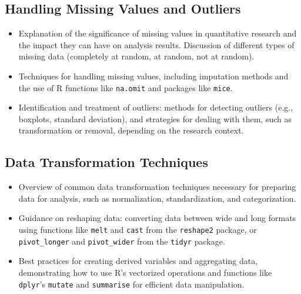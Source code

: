 \documentclass[
]{book}
\begin{document}
\hypertarget{handling-missing-values-and-outliers}{%
\subsection*{Handling Missing Values and Outliers}\label{handling-missing-values-and-outliers}}

\begin{itemize}
\item
  Explanation of the significance of missing values in quantitative research and the impact they can have on analysis results. Discussion of different types of missing data (completely at random, at random, not at random).
\item
  Techniques for handling missing values, including imputation methods and the use of R functions like \texttt{na.omit} and packages like \texttt{mice}.
\item
  Identification and treatment of outliers: methods for detecting outliers (e.g., boxplots, standard deviation), and strategies for dealing with them, such as transformation or removal, depending on the research context.
\end{itemize}

\hypertarget{data-transformation-techniques}{%
\subsection*{Data Transformation Techniques}\label{data-transformation-techniques}}

\begin{itemize}
\item
  Overview of common data transformation techniques necessary for preparing data for analysis, such as normalization, standardization, and categorization.
\item
  Guidance on reshaping data: converting data between wide and long formats using functions like \texttt{melt} and \texttt{cast} from the \texttt{reshape2} package, or \texttt{pivot\_longer} and \texttt{pivot\_wider} from the \texttt{tidyr} package.
\item
  Best practices for creating derived variables and aggregating data, demonstrating how to use R's vectorized operations and functions like \texttt{dplyr}'s \texttt{mutate} and \texttt{summarise} for efficient data manipulation.
\end{itemize}
\end{document}
